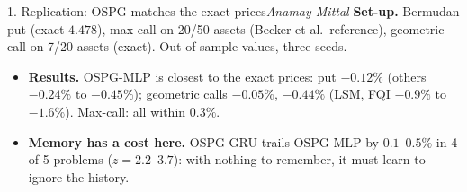 \documentclass[aspectratio=169,11pt]{beamer}
\newcommand{\by}[1]{\hfill{\normalfont\small\itshape #1}}
\begin{document}
\begin{frame}{1. Replication: OSPG matches the exact prices\by{Anamay Mittal}}
\small
\textbf{Set-up.} Bermudan put (exact $4.478$), max-call on 20/50 assets (Becker et al.\ reference),
geometric call on 7/20 assets (exact). Out-of-sample values, three seeds.

\vspace{4pt}
\centering\scriptsize


\vspace{4pt}\raggedright
\begin{itemize}\small
\item \textbf{Results.} OSPG-MLP is closest to the exact prices: put $-0.12\%$ (others $-0.24\%$ to
  $-0.45\%$); geometric calls $-0.05\%$, $-0.44\%$ (LSM, FQI $-0.9\%$ to $-1.6\%$). Max-call: all
  within $0.3\%$.
\item \textbf{Memory has a cost here.} OSPG-GRU trails OSPG-MLP by $0.1$--$0.5\%$ in 4 of 5
  problems ($z=2.2$--$3.7$): with nothing to remember, it must learn to ignore the history.
\end{itemize}
\end{frame}
\end{document}
